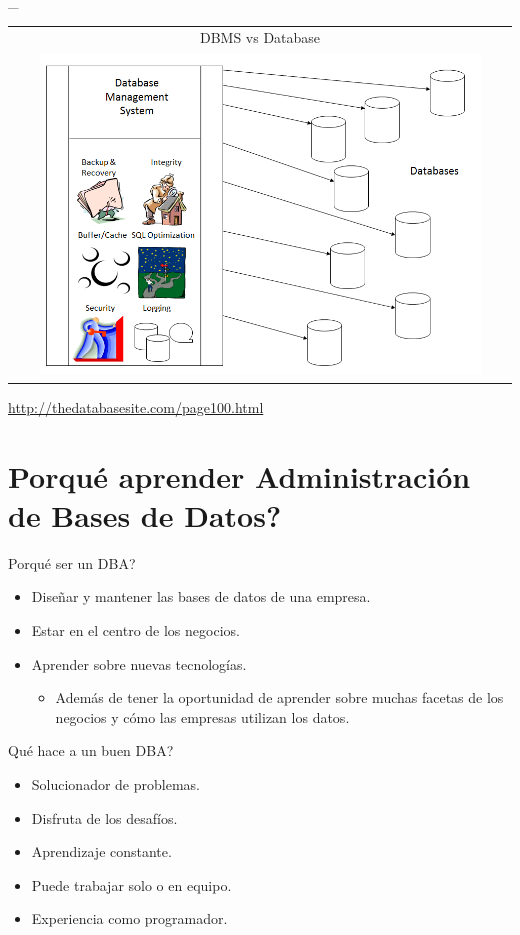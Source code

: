 \documentclass{beamer}
\newcommand{\toRight}[1]{
    \begin{FlushRight}
        {\tiny #1}
    \end{FlushRight}
} %
\begin{document}
\begin{frame}{\_}
    \begin{tabular}{c}
        DBMS vs Database \\
        \includegraphics[width=0.9\textwidth]{figures/dbms_vs_database.png}
    \end{tabular}
    \toRight{\url{http://thedatabasesite.com/page100.html}}
\end{frame}

\section{Porqué aprender Administración de Bases de Datos?}

\begin{frame}{Porqué ser un DBA?}
    \begin{itemize}
        \item Diseñar y mantener las bases de datos de una empresa.
        \item Estar en el centro de los negocios.
        \item Aprender sobre nuevas tecnologías.
        \begin{itemize}
            \item Además de tener la oportunidad de aprender sobre muchas facetas de los negocios y cómo las empresas utilizan los datos.
        \end{itemize}
    \end{itemize}
\end{frame}

\begin{frame}{Qué hace a un buen DBA?}
    \begin{itemize}
        \item Solucionador de problemas.
        \item Disfruta de los desafíos.
        \item Aprendizaje constante.
        \item Puede trabajar solo o en equipo.
        \item Experiencia como programador.
    \end{itemize}
\end{frame}
\end{document}
